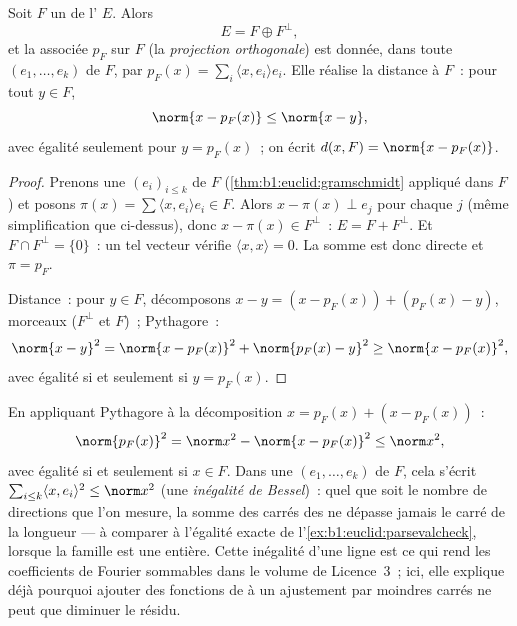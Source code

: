 \begin{theorem}\label{thm:b1:euclid:projection}
Soit $F$ un  de l' $E$. Alors
\[
E = F \oplus F^{\perp},
\]
et la  associée $p_F$ sur $F$ (la \emph{projection
orthogonale}) est donnée, dans toute
  $(e_1, \dots, e_k)$ de $F$, par $p_F(x) = \sum_i
\langle x, e_i\rangle e_i$. Elle réalise la distance à $F$~:
pour tout $y \in F$,
\[
\norm{x - p_F(x)} \leq \norm{x - y},
\]
avec égalité seulement pour $y = p_F(x)$~; on écrit $d(x, F) =
\norm{x - p_F(x)}$.
\end{theorem}

\begin{proof}
Prenons une   $(e_i)_{i \leq k}$ de $F$
(\cref{thm:b1:euclid:gramschmidt} appliqué dans $F$) et posons
$\pi(x) = \sum \langle x, e_i\rangle e_i \in F$. Alors $x - \pi(x)
\perp e_j$ pour chaque $j$ (même simplification que ci-dessus), donc
$x - \pi(x) \in F^\perp$~: $E = F + F^\perp$. Et $F \cap F^\perp =
\{0\}$~: un tel vecteur vérifie $\langle x, x\rangle = 0$. La somme
est donc directe et $\pi = p_F$.

Distance~: pour $y \in F$, décomposons $x - y = (x - p_F(x)) +
(p_F(x) - y)$, morceaux  ($F^\perp$ et $F$)~; Pythagore~:
\[
\norm{x - y}^2 = \norm{x - p_F(x)}^2 + \norm{p_F(x) - y}^2
\geq \norm{x - p_F(x)}^2,
\]
avec égalité si et seulement si $y = p_F(x)$.
\end{proof}

\begin{example}
\label{ex:b1:euclid:bessel}
En appliquant Pythagore à la décomposition $x = p_F(x) + (x -
p_F(x))$~:
\[
\norm{p_F(x)}^2 = \norm x^2 - \norm{x - p_F(x)}^2 \leq
\norm x^2 ,
\]
avec égalité si et seulement si $x \in F$. Dans une 
 $(e_1, \dots, e_k)$ de $F$, cela s'écrit $\sum_{i \leq
k}\langle x, e_i\rangle^2 \leq \norm x^2$ (une \emph{inégalité de
Bessel})~: quel que soit le nombre de directions  que
l'on mesure, la somme des carrés des  ne dépasse jamais
le carré de la longueur --- à comparer à l'égalité exacte de
l'\cref{ex:b1:euclid:parsevalcheck}, lorsque la famille est une 
entière. Cette inégalité d'une ligne est ce qui rend les
coefficients de Fourier sommables dans le volume de Licence~3~; ici,
elle explique déjà pourquoi ajouter des fonctions de  à un
ajustement par moindres carrés ne peut que diminuer le résidu.
\end{example}

